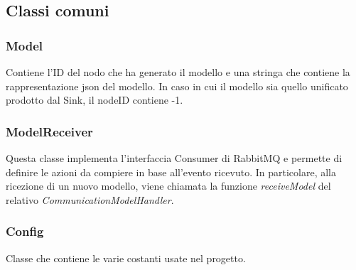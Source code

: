     \subsection{Classi comuni}
      \subsubsection{Model}
        Contiene l'ID del nodo che ha generato il modello e una stringa che contiene la rappresentazione json del modello. In caso in cui il modello sia quello unificato prodotto dal Sink, il nodeID contiene -1.
        

      \subsubsection{ModelReceiver}\label{ModelReceiver}
        Questa classe implementa l'interfaccia Consumer di RabbitMQ e permette di definire le azioni da compiere in base all'evento ricevuto. In particolare, alla ricezione di un nuovo modello, viene chiamata la funzione \textit{receiveModel} del relativo \textit{CommunicationModelHandler}.
        

      \subsubsection{Config}
        Classe che contiene le varie costanti usate nel progetto.
        
